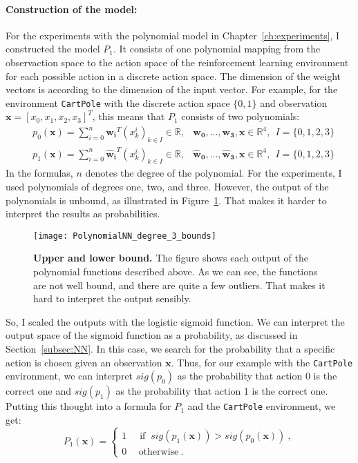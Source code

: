 \paragraph*{Construction of the model:} For the experiments with the polynomial model in Chapter~\ref{ch:experiments}, I constructed the model $P_1$. It consists of one polynomial mapping from the observaction space to the action space of the reinforcement learning environment for each possible action in a discrete action space. The dimension of the weight vectors is according to the dimension of the input vector. For example, for the environment \verb|CartPole| with the discrete action space $\{0, 1\}$ and observation $\mathbf{x} = [x_0, x_1, x_2, x_3]^T$, this means that $P_1$ consists of two polynomials:
\begin{align*}
  &p_0(\mathbf{x}) = \sum_{i=0}^{n} \mathbf{w_i}^T (x_k^i)_{k \in I} \in \mathbb{R}, &\mathbf{w_0}, ..., \mathbf{w_3}, \mathbf{x} \in \mathbb{R}^4, \ \ I = \{0, 1, 2, 3\} \\
  &p_1(\mathbf{x}) = \sum_{i=0}^{n} \mathbf{\hat{w}_i}^T (x_k^i)_{k \in I} \in \mathbb{R}, &\mathbf{\hat{w}_0}, ..., \mathbf{\hat{w}_3}, \mathbf{x} \in \mathbb{R}^4, \ \ I = \{0, 1, 2, 3\}
\end{align*}
In the formulas, $n$ denotes the degree of the polynomial. For the experiments, I used polynomials of degrees one, two, and three. However, the output of the polynomials is unbound, as illustrated in Figure~\ref{fig:bounds}. That makes it harder to interpret the results as probabilities.
\begin{figure}[ht]
\centering
\texttt{[image: PolynomialNN\_degree\_3\_bounds]}
\caption[Upper and lower bound]{
  \textbf{Upper and lower bound.}
  The figure shows each output of the polynomial functions described above. As we can see, the functions are not well bound, and there are quite a few outliers. That makes it hard to interpret the output sensibly.
}
\label{fig:bounds}
\end{figure}
So, I scaled the outputs with the logistic sigmoid function. We can interpret the output space of the sigmoid function as a probability, as discussed in Section~\ref{subsec:NN}. In this case, we search for the probability that a specific action is chosen given an observation $\mathbf{x}$. Thus, for our example with the \verb|CartPole| environment, we can interpret $sig(p_0)$ as the probability that action 0 is the correct one and $sig(p_1)$ as the probability that action 1 is the correct one. Putting this thought into a formula for $P_1$ and the \verb|CartPole| environment, we get:
\[
  P_1(\mathbf{x}) =
  \begin{cases}1~&{\text{ if }}~sig(p_1(\mathbf{x})) > sig(p_0(\mathbf{x}))~,\\0~&~\text{otherwise}~.\end{cases}
\]

